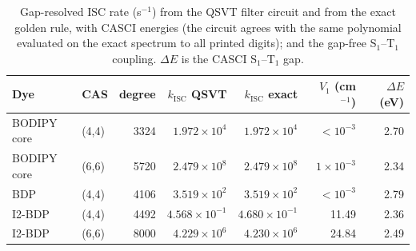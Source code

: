 \documentclass[journal=jctcce,manuscript=article]{achemso}
\newcommand{\kisc}{k_\mathrm{ISC}}
\begin{document}
\begin{table}
  \caption{Gap-resolved ISC rate (s$^{-1}$) from the QSVT filter circuit and from the exact golden rule,
  with CASCI energies (the circuit agrees with the same polynomial evaluated on the exact spectrum to all
  printed digits); and the gap-free S$_1$--T$_1$ coupling. $\Delta E$ is the CASCI S$_1$--T$_1$ gap.}
  \label{tab:filter}
  \begin{tabular}{llrrrrr}
    \toprule
    Dye & CAS & degree & $\kisc$ QSVT & $\kisc$ exact & $V_1$ (cm$^{-1}$) & $\Delta E$ (eV) \\
    \midrule
    BODIPY core & (4,4) & 3324 & $1.972\times10^{4}$ & $1.972\times10^{4}$ & $<10^{-3}$ & 2.70 \\
    BODIPY core & (6,6) & 5720 & $2.479\times10^{8}$ & $2.479\times10^{8}$ & $1\times10^{-3}$ & 2.34 \\
    BDP         & (4,4) & 4106 & $3.519\times10^{2}$ & $3.519\times10^{2}$ & $<10^{-3}$ & 2.79 \\
    I2-BDP      & (4,4) & 4492 & $4.568\times10^{-1}$ & $4.680\times10^{-1}$ & 11.49 & 2.36 \\
    I2-BDP      & (6,6) & 8000 & $4.229\times10^{6}$ & $4.230\times10^{6}$ & 24.84 & 2.49 \\
    \bottomrule
  \end{tabular}
\end{table}
\end{document}

